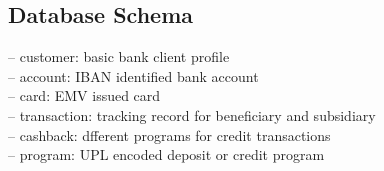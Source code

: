 \subsection{Database Schema}

\vbox{
-- customer: basic bank client profile \\
-- account: IBAN identified bank account \\
-- card: EMV issued card\\
-- transaction: tracking record for beneficiary and subsidiary\\
-- cashback: dfferent programs for credit transactions\\
-- program: UPL encoded deposit or credit program\\
}
